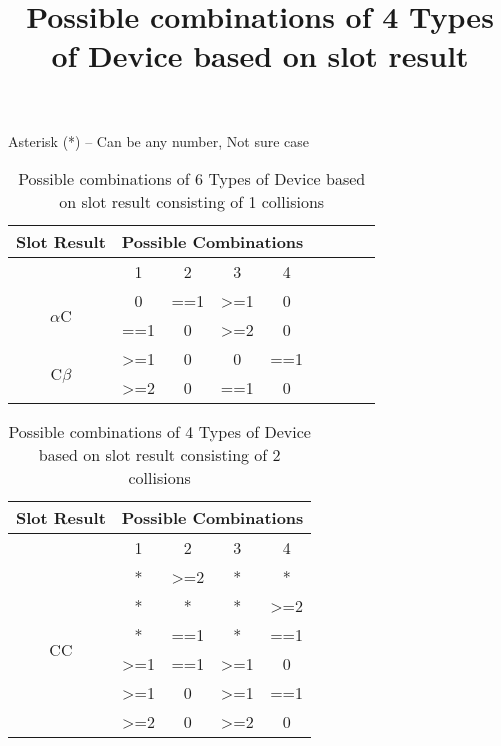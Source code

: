 \documentclass[fleqn]{article}
\begin{document}
\title{Possible combinations of 4 Types of Device based on slot result}

\maketitle{}

Asterisk (*) – Can be any number, Not sure case 


\begin{table}[h!]
\centering
\begin{tabular}{|c|c|c|c|c|c|c|c|c|}
\hline
Slot Result & \multicolumn{4}{c|}{Possible Combinations} \\ \hline
 & 1 & 2 & 3 & 4 \\ \hline
\multirow{2}{*}{$\alpha$C} & 0 & ==1 & \textgreater{}=1 & 0 \\ \cline{2-5} 
 & ==1 & 0 & \textgreater{}=2 & 0 \\ \hline
\multirow{2}{*}{C$\beta$} & \textgreater{}=1 & 0 & 0 & ==1 \\ \cline{2-5} 
 & \textgreater{}=2 & 0 & ==1 & 0 \\ \hline
\end{tabular}
\caption{Possible combinations of 6 Types of Device based on slot result consisting of 1 collisions}
\label{Tab8_2C}
\end{table}

\begin{table}[h!]
\centering
\label{my-label}
\begin{tabular}{|c|c|c|c|c|}
\hline
Slot Result & \multicolumn{4}{l|}{Possible Combinations} \\ \hline
 & 1 & 2 & 3 & 4 \\ \hline
\multirow{6}{*}{CC} & * & \textgreater{}=2 & * & * \\ \cline{2-5} 
 & * & * & * & \textgreater{}=2 \\ \cline{2-5} 
 & * & ==1 & * & ==1 \\ \cline{2-5} 
 & \textgreater{}=1 & ==1 & \textgreater{}=1 & 0 \\ \cline{2-5} 
 & \textgreater{}=1 & 0 & \textgreater{}=1 & ==1 \\ \cline{2-5} 
 & \textgreater{}=2 & 0 & \textgreater{}=2 & 0 \\ \hline
\end{tabular}
\caption{Possible combinations of 4 Types of Device based on slot result consisting of 2 collisions}
\end{table}
\end{document}
